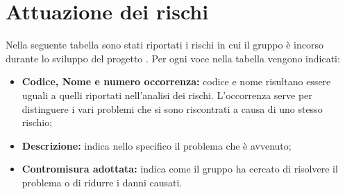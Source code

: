 \section{Attuazione dei rischi}

Nella seguente tabella sono stati riportati i rischi in cui il gruppo \Omicron{} è incorso durante lo sviluppo del progetto \nameproject{}.
Per ogni voce nella tabella vengono indicati:
\begin{itemize}
\item \textbf{Codice, Nome e numero occorrenza:} codice e nome risultano essere uguali a quelli riportati nell'analisi dei rischi. L'occorrenza serve per distinguere i vari problemi che si sono riscontrati a causa di uno stesso rischio;
\item \textbf{Descrizione:} indica nello specifico il problema che è avvenuto;
\item \textbf{Contromisura adottata:} indica come il gruppo ha cercato di risolvere il problema o di ridurre i danni causati.
\end{itemize}


